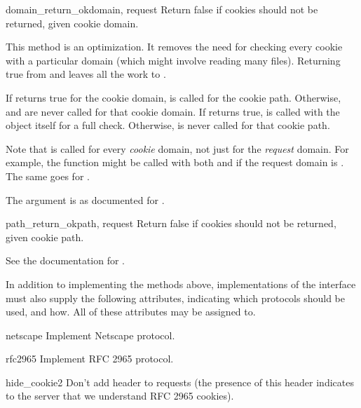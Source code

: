 \begin{methoddesc}[CookiePolicy]{domain_return_ok}{domain, request}
Return false if cookies should not be returned, given cookie domain.

This method is an optimization.  It removes the need for checking
every cookie with a particular domain (which might involve reading
many files).  Returning true from  and
 leaves all the work to .

If  returns true for the cookie domain,
 is called for the cookie path.  Otherwise,
 and  are never called
for that cookie domain.  If  returns true,
 is called with the  object itself
for a full check.  Otherwise,  is never called for
that cookie path.

Note that  is called for every
\emph{cookie} domain, not just for the \emph{request} domain.  For
example, the function might be called with both 
and  if the request domain is
.  The same goes for
.

The  argument is as documented for .
\end{methoddesc}

\begin{methoddesc}[CookiePolicy]{path_return_ok}{path, request}
Return false if cookies should not be returned, given cookie path.

See the documentation for .
\end{methoddesc}


In addition to implementing the methods above, implementations of the
 interface must also supply the following
attributes, indicating which protocols should be used, and how.  All
of these attributes may be assigned to.

\begin{memberdesc}{netscape}
Implement Netscape protocol.
\end{memberdesc}
\begin{memberdesc}{rfc2965}
Implement RFC 2965 protocol.
\end{memberdesc}
\begin{memberdesc}{hide_cookie2}
Don't add  header to requests (the presence of
this header indicates to the server that we understand RFC 2965
cookies).
\end{memberdesc}

